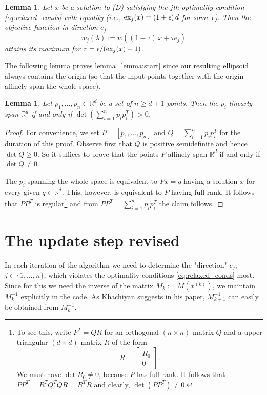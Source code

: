 \documentclass[a4paper,twocolumn]{article}
\newcommand{\R}{\ensuremath{\mathbb{R}}}
\newcommand{\excess}{\ensuremath{\mathop{\rm ex}\nolimits}}
\newtheorem{lemma}[theorem]{Lemma}
\begin{document}
\begin{lemma}
  Let $x$ be a solution to (D) satisfying the $j$th optimality
  condition \eqref{eq:relaxed_conds} with equality (i.e.,
  $\excess_j(x)=(1+\epsilon)\,d$ for some $\epsilon$).  Then
  the objective function in direction $e_j$
  \begin{equation}
    \label{eq:lin_search}
    w_j(\lambda):= w((1-\tau)\,x + \tau e_j)
  \end{equation}
  attains its maximum for $\tau = \epsilon / (\excess_j(x) - 1)$.
\end{lemma}

The following lemma proves lemma~\ref{lemma:start} since our resulting
ellipsoid always contains the origin (so that the input points
together with the origin affinely span the whole space).
%
\begin{lemma}
   Let $p_1,\ldots,p_n\in\R^d$ be a set of $n\ge d+1$ points.  Then
   the $p_i$ linearly span $\R^d$ if and only if $\det(\sum_{i=1}^n
   p_i p_i^T)>0$.
\end{lemma}
%
\begin{proof}
  For convenience, we set $P = [p_1,\ldots,p_n]$ and $Q=\sum_{i=1}^n
  p_i p_i^T$ for the duration of this proof.  Observe first that $Q$
  is positive semidefinite and hence $\det Q \ge 0$.  So it suffices
  to prove that the points $P$ affinely span $\R^d$ if and only if
  $\det Q \not=0$.
  
  The $p_i$ spanning the whole space is equivalent to $Px=q$ having a
  solution $x$ for every given $q\in\R^d$.  This, however, is
  equivalent to $P$ having full rank.  It follows that $PP^T$ is
  regular\footnote{To see this, write $P^T = QR$ for an orthogonal
  $(n\times n)$-matrix $Q$ and a upper triangular $(d\times d)$-matrix
  $R$ of the form
  \[ R = \left[
  \begin{array}{c}
  R_0 \\ 0
  \end{array}
  \right].
  \]
  We must have $\det R_0\not=0$, because $P$ has full rank.  It
  follows that $PP^T = R^TQ^T Q R = R^T R$ and clearly,
  $\det(PP^T)\not=0$.} and from $PP^T = \sum_{i=1}^n p_i p_i^T$ the
  claim follows.
\end{proof}

\section{The update step revised}
In each iteration of the algorithm we need to determine the
"direction" $e_j$, $j\in\{1,\ldots,n\}$, which violates the
optimality conditions \eqref{eq:relaxed_conds} most.  Since for this
we need the inverse of the matrix $M_k:= M(x^{(k)})$, we maintain
$M_k^{-1}$ explicitly in the code.  As Khachiyan suggests in his
paper, $M_{k+1}^{-1}$ can easily be obtained from $M_k^{-1}$.
\end{document}
